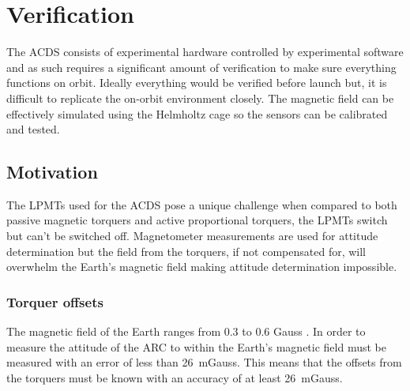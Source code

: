 
\chapter{Verification}

\label{ch:Verification}

The \ac{ACDS} consists of experimental hardware controlled by experimental software and as such requires a significant amount of verification to make sure everything functions on orbit. Ideally everything would be verified before launch but, it is difficult to replicate the on-orbit environment closely. The magnetic field can be effectively simulated using the Helmholtz cage so the sensors can be calibrated and tested. 

\section{Motivation}

The \acp{LPMT} used for the \ac{ACDS} pose a unique challenge when compared to both passive magnetic torquers and active proportional torquers, the \acp{LPMT} switch but can't be switched off. Magnetometer measurements are used for attitude determination but the field from the torquers, if not compensated for, will overwhelm the Earth's magnetic field making attitude determination impossible.

\subsection{Torquer offsets}





The magnetic field of the Earth ranges from 0.3 to 0.6 Gauss \cite[pp.~114]{Wertz}. In order to measure the attitude of the \ac{ARC} to within {\textdegree} the Earth's magnetic field must be measured with an error of less than 26~mGauss. This means that the offsets from the torquers must be known with an accuracy of at least 26~mGauss.

